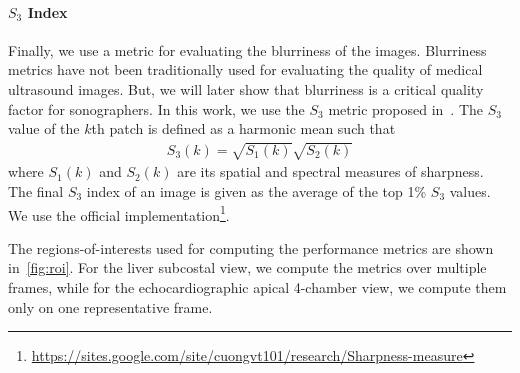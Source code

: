 \paragraph{\(S_3\) Index}
Finally, we use a metric for evaluating the blurriness of the images.
Blurriness metrics have not been traditionally used for evaluating the quality of medical ultrasound images.
But, we will later show that blurriness is a critical quality factor for sonographers.
In this work, we use the \(S_3\) metric proposed in~\cite{vu_bf_2012}.
The \(S_3\) value of the \(k\)th patch is defined as a harmonic mean such that
\begin{align}
  S_3\left(k\right) = \sqrt{S_1\left(k\right)} \sqrt{S_2\left(k\right)}
\end{align}
{\noindent}where \(S_1\left(k\right)\) and \(S_2\left(k\right)\) are its spatial and spectral measures of sharpness.
The final \(S_3\) index of an image is given as the average of the top 1\% \(S_3\) values.
We use the official implementation\footnote{\url{https://sites.google.com/site/cuongvt101/research/Sharpness-measure}}.

The regions-of-interests used for computing the performance metrics are shown in~\cref{fig:roi}.
For the liver subcostal view, we compute the metrics over multiple frames, while for the echocardiographic apical 4-chamber view, we compute them only on one representative frame.


